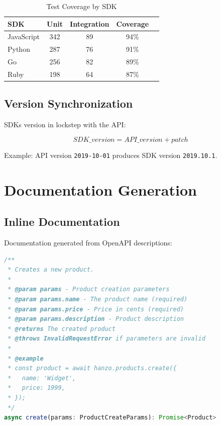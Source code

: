 \documentclass[11pt,a4paper]{article}
\begin{document}
\begin{table}[h]
\centering
\caption{Test Coverage by SDK}
\begin{tabular}{lcccc}
\toprule
\textbf{SDK} & \textbf{Unit} & \textbf{Integration} & \textbf{Coverage} \\
\midrule
JavaScript & 342 & 89 & 94\% \\
Python & 287 & 76 & 91\% \\
Go & 256 & 82 & 89\% \\
Ruby & 198 & 64 & 87\% \\
\bottomrule
\end{tabular}
\end{table}

\subsection{Version Synchronization}

SDKs version in lockstep with the API:

\begin{equation}
SDK\_version = API\_version + patch
\end{equation}

Example: API version \texttt{2019-10-01} produces SDK version \texttt{2019.10.1}.

\section{Documentation Generation}

\subsection{Inline Documentation}

Documentation generated from OpenAPI descriptions:

\begin{lstlisting}[language=JavaScript, caption=Generated Documentation]
/**
 * Creates a new product.
 *
 * @param params - Product creation parameters
 * @param params.name - The product name (required)
 * @param params.price - Price in cents (required)
 * @param params.description - Product description
 * @returns The created product
 * @throws InvalidRequestError if parameters are invalid
 *
 * @example
 * const product = await hanzo.products.create({
 *   name: 'Widget',
 *   price: 1999,
 * });
 */
async create(params: ProductCreateParams): Promise<Product>
\end{lstlisting}
\end{document}
